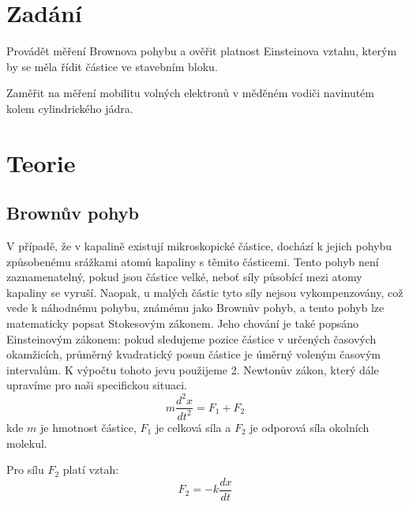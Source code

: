 \documentclass[a4paper,11pt]{article}
\begin{document}
\section{Zadání}
    Provádět měření Brownova pohybu a ověřit platnost Einsteinova vztahu, kterým by se měla řídit částice ve stavebním bloku.
    \par Zaměřit na měření mobilitu volných elektronů v měděném vodiči navinutém kolem cylindrického jádra.
    \par
    \vspace{10px}
    \begin{minipage}[t]{0.5\textwidth} 
    \section{Teorie}
        \subsection{Brownův pohyb}
            V případě, že v kapalině existují mikroskopické částice, dochází k jejich pohybu způsobenému srážkami atomů kapaliny s těmito částicemi. Tento pohyb není zaznamenatelný, pokud jsou částice velké, neboť síly působící mezi atomy kapaliny se vyruší. Naopak, u malých částic tyto síly nejsou vykompenzovány, což vede k náhodnému pohybu, známému jako Brownův pohyb, a tento pohyb lze matematicky popsat Stokesovým zákonem. Jeho chování je také popsáno Einsteinovým zákonem: pokud sledujeme pozice částice v určených časových okamžicích, průměrný kvadratický posun částice je úměrný voleným časovým intervalům. K výpočtu tohoto jevu použijeme 2. Newtonův zákon, který dále upravíme pro naši specifickou situaci.
            \begin{equation}
                m \frac{d^2x}{dt^2} = F_1 + F_2
            \end{equation}
            kde $m$ je hmotnost částice, $F_1$ je celková síla a $F_2$ je odporová síla okolních molekul. 
            \par Pro sílu $F_2$ platí vztah:
            \begin{equation}
                F_2 = -k \frac{dx}{dt}
            \end{equation}
    \end{minipage}
    \hspace{10pt}
\end{document}
